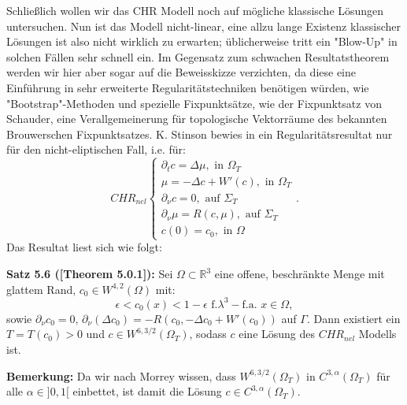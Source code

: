 Schließlich wollen wir das CHR Modell noch auf mögliche klassische Lösungen untersuchen. Nun ist das Modell nicht-linear, eine allzu lange Existenz klassischer Lösungen ist also nicht wirklich zu erwarten; üblicherweise tritt ein "Blow-Up" in solchen Fällen sehr schnell ein. Im Gegensatz zum schwachen Resultatstheorem werden wir hier aber sogar auf die Beweisskizze verzichten, da diese eine Einführung in sehr erweiterte Regularitätstechniken benötigen würden, wie "Bootstrap"-Methoden und spezielle Fixpunktsätze, wie der Fixpunktsatz von Schauder, eine Verallgemeinerung für topologische Vektorräume des bekannten Brouwerschen Fixpunktsatzes. K. Stinson bewies in \cite{stinson2021analysis} ein Regularitätsresultat nur für den nicht-eliptischen Fall, i.e. für:
\begin{equation}
    CHR_{nel} \begin{cases}
        \partial_t c = \Delta \mu, \text{ in }\Omega_T \\
        \mu = - \Delta c + W'(c), \text{ in }\Omega_T \\
        \partial_{\nu} c = 0, \text{ auf }\Sigma_T \\
        \partial_{\nu} \mu = R(c,\mu), \text{ auf }\Sigma_T \\
        c(0) = c_0, \text{ in }\Omega
    \end{cases}.
\end{equation}
Das Resultat liest sich wie folgt:\\[0.5cm]
\colorbox{generalYellow}{\begin{minipage}{16cm}{\textcolor{black}{}{\label{theo5.6}}}
\textbf{Satz 5.6 (\cite{stinson2021analysis}[Theorem 5.0.1]):} Sei \(\Omega \subset \mathbb{R}^3\) eine offene, beschränkte Menge mit glattem Rand, \(c_0 \in W^{4,2}(\Omega)\) mit:
\begin{equation}
    \epsilon < c_0(x) < 1 - \epsilon \text{ f.}\lambda^3-\text{f.a. }x \in \Omega,
\end{equation}
sowie \(\partial_{\nu} c_0 = 0, \, \partial_{\nu}(\Delta c_0) = -R(c_0,-\Delta c_0 + W'(c_0))\) auf \(\Gamma\). Dann existiert ein \(T = T(c_0) > 0\) und \(c \in W^{6,3/2}(\Omega_T)\), sodass \(c\) eine Lösung des \(CHR_{nel}\) Modells ist.
\end{minipage}}

\textbf{Bemerkung:} Da wir nach Morrey wissen, dass \(W^{6,3/2}(\Omega_T)\) in \(C^{3,\alpha}(\Omega_T)\) für alle \(\alpha \in ]0,1[\) einbettet, ist damit die Lösung \(c \in C^{3,\alpha}(\Omega_T)\).
